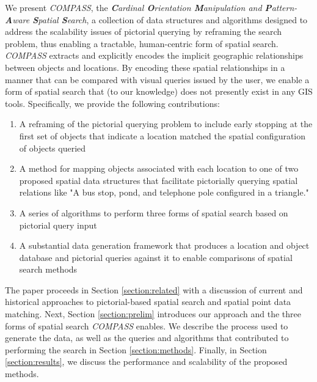 \par{We present \emph{COMPASS}, the \textit{\textbf{C}ardinal \textbf{O}rientation \textbf{M}anipulation and \textbf{P}attern-\textbf{A}ware \textbf{S}patial \textbf{S}earch}, a collection of data structures and algorithms designed to address the scalability issues of pictorial querying by reframing the search problem, thus enabling a tractable, human-centric form of spatial search. 
\emph{COMPASS} extracts and explicitly encodes the implicit geographic relationships between objects and locations. 
By encoding these spatial relationships in a manner that can be compared with visual queries issued by the user, we enable a form of spatial search that (to our knowledge) does not presently exist in any GIS tools.
Specifically, we provide the following contributions:
\begin{enumerate}
    \item A reframing of the pictorial querying problem to include early stopping at the first set of objects that indicate a location matched the spatial configuration of objects queried
    \item A method for mapping objects associated with each location to one of two proposed spatial data structures that facilitate pictorially querying spatial relations like "A bus stop, pond, and telephone pole configured in a triangle."
    \item A series of algorithms to perform three forms of spatial search based on pictorial query input
    \item A substantial data generation framework that produces a location and object database and pictorial queries against it to enable comparisons of spatial search methods
\end{enumerate}

The paper proceeds in Section \ref{section:related} with a discussion of current and historical approaches to pictorial-based spatial search and spatial point data matching. 
Next, Section \ref{section:prelim} introduces our approach and the three forms of spatial search \emph{COMPASS} enables.
We describe the process used to generate the data, as well as the queries and algorithms that contributed to performing the search in Section \ref{section:methods}. 
Finally, in Section \ref{section:results}, we discuss the performance and scalability of the proposed methods.
}


